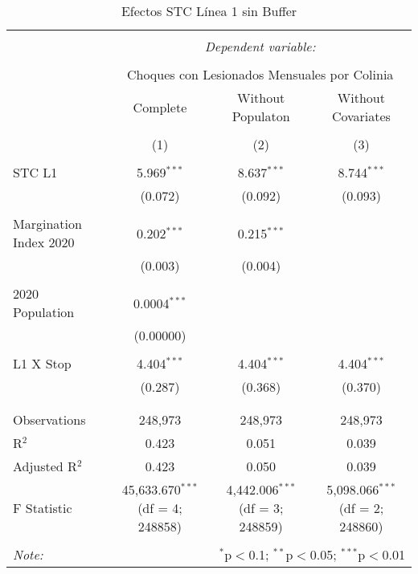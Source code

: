 
\begin{table}[!htbp] \centering 
  \caption{Efectos STC Línea 1 sin Buffer} 
  \label{} 
\begin{tabular}{@{\extracolsep{5pt}}lccc} 
\\[-1.8ex]\hline 
\hline \\[-1.8ex] 
 & \multicolumn{3}{c}{\textit{Dependent variable:}} \\ 
\cline{2-4} 
\\[-1.8ex] & \multicolumn{3}{c}{Choques con Lesionados Mensuales por Colinia} \\ 
 & Complete & Without Populaton & Without Covariates \\ 
\\[-1.8ex] & (1) & (2) & (3)\\ 
\hline \\[-1.8ex] 
 STC L1 & 5.969$^{***}$ & 8.637$^{***}$ & 8.744$^{***}$ \\ 
  & (0.072) & (0.092) & (0.093) \\ 
  & & & \\ 
 Margination Index 2020 & 0.202$^{***}$ & 0.215$^{***}$ &  \\ 
  & (0.003) & (0.004) &  \\ 
  & & & \\ 
 2020 Population & 0.0004$^{***}$ &  &  \\ 
  & (0.00000) &  &  \\ 
  & & & \\ 
 L1 X Stop & 4.404$^{***}$ & 4.404$^{***}$ & 4.404$^{***}$ \\ 
  & (0.287) & (0.368) & (0.370) \\ 
  & & & \\ 
\hline \\[-1.8ex] 
Observations & 248,973 & 248,973 & 248,973 \\ 
R$^{2}$ & 0.423 & 0.051 & 0.039 \\ 
Adjusted R$^{2}$ & 0.423 & 0.050 & 0.039 \\ 
F Statistic & 45,633.670$^{***}$ (df = 4; 248858) & 4,442.006$^{***}$ (df = 3; 248859) & 5,098.066$^{***}$ (df = 2; 248860) \\ 
\hline 
\hline \\[-1.8ex] 
\textit{Note:}  & \multicolumn{3}{r}{$^{*}$p$<$0.1; $^{**}$p$<$0.05; $^{***}$p$<$0.01} \\ 
\end{tabular} 
\end{table} 
